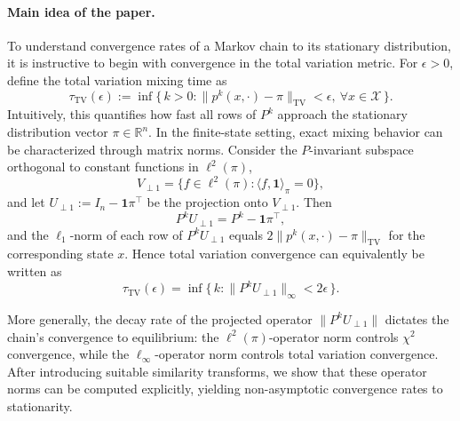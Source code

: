 \documentclass[preprint]{imsart}
\theoremstyle{plain}
\theoremstyle{definition}
\begin{document}
\paragraph{Main idea of the paper.}
To understand convergence rates of a Markov chain to its stationary distribution, it is instructive to begin with convergence in the total variation metric. 
For $\epsilon>0$, define the total variation mixing time as
\[
\tau_{\mathrm{TV}}(\epsilon)
:= \inf \{\,k > 0 : \|p^{k}(x,\cdot) - \pi\|_{\mathrm{TV}} < \epsilon,\ \forall x \in \mathcal{X}\,\}.
\]
Intuitively, this quantifies how fast all rows of $P^{k}$ approach the stationary distribution vector $\pi \in \mathbb{R}^{n}$. In the finite-state setting, exact mixing behavior can be characterized through matrix norms. 
Consider the $P$-invariant subspace orthogonal to constant functions in $\ell^{2}(\pi)$,
\[
V_{\perp 1} = \{ f \in \ell^{2}(\pi) : \langle f, \mathbf{1} \rangle_{\pi} = 0 \},
\]
and let $U_{\perp 1} := I_{n} - \mathbf{1}\pi^{\top}$ be the projection onto $V_{\perp 1}$.
Then
\[
P^{k} U_{\perp 1} = P^{k} - \mathbf{1}\pi^{\top},
\]
and the $\ell_{1}$-norm of each row of $P^{k} U_{\perp 1}$ equals
$2\|p^{k}(x,\cdot) - \pi\|_{\mathrm{TV}}$ for the corresponding state $x$.
Hence total variation convergence can equivalently be written as
\[
\tau_{\mathrm{TV}}(\epsilon)
 = \inf\{\,k : \|P^{k}U_{\perp 1}\|_{\infty} < 2\epsilon\,\}.
\]

More generally, the decay rate of the projected operator $\|P^{k}U_{\perp 1}\|$
dictates the chain’s convergence to equilibrium:
the $\ell^{2}(\pi)$-operator norm controls $\chi^{2}$ convergence, while
the $\ell_{\infty}$-operator norm controls total variation convergence.
After introducing suitable similarity transforms, we show that these operator norms can be computed explicitly, yielding non-asymptotic convergence rates to stationarity.
\end{document}
